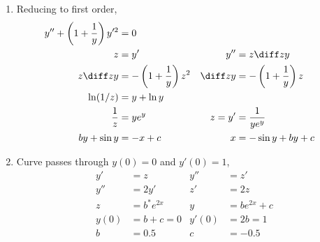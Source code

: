 \begin{enumerate}
    \item Reducing to first order,
          \begin{align}
              y'' + \left( 1 + \frac{1}{y} \right)y'^{2} & = 0                         \\
              z                                          & = y'                      &
              y''                                        & = z \diff zy                \\
              z\diff zy                                  & = -\left( 1 + \frac{1}{y}
              \right)z^{2}                               & \diff zy                  &
              = -\left( 1 + \frac{1}{y} \right)z                                       \\
              \ln (1/z)                                  & = y + \ln y                 \\
              \frac{1}{z}                                & = ye^{y}                  &
              z = y'                                     & = \frac{1}{ye^{y}}          \\
              by + \sin y                                & = -x +c                   &
              x                                          & = -\sin y +by + c
          \end{align}

    \item Curve passes through $ y(0) = 0 $ and $ y'(0) = 1 $,
          \begin{align}
              y'   & = z           & y''   & = z'          \\
              y''  & = 2y'         & z'    & = 2z          \\
              z    & = b^{*}e^{2x} & y     & = be^{2x} + c \\
              y(0) & = b + c = 0   & y'(0) & = 2b = 1      \\
              b    & = 0.5         & c     & = -0.5
          \end{align}
          \begin{figure}[H]
              \centering
          \end{figure}


\end{enumerate}

